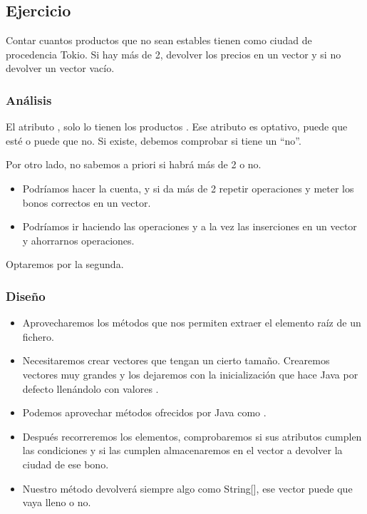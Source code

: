 \documentclass[letterpaper,10pt,spanish]{sphinxmanual}
\begin{document}
\subsection{Ejercicio}
\label{tema6:id13}
Contar cuantos productos que no sean estables tienen como ciudad de procedencia Tokio. Si hay más de 2, devolver los precios en un vector y si no devolver un vector vacío.


\subsubsection{Análisis}
\label{tema6:id14}
El atributo , solo lo tienen los productos . Ese atributo es optativo, puede que esté o puede que no. Si existe, debemos comprobar si tiene un ``no''.

Por otro lado, no sabemos a priori si habrá más de 2 o no.
\begin{itemize}
\item {} 
Podríamos hacer la cuenta, y si da más de 2 repetir operaciones y meter los bonos correctos en un vector.

\item {} 
Podríamos ir haciendo las operaciones y a la vez las inserciones en un vector y ahorrarnos operaciones.

\end{itemize}

Optaremos por la segunda.


\subsubsection{Diseño}
\label{tema6:id15}\begin{itemize}
\item {} 
Aprovecharemos los métodos que nos permiten extraer el elemento raíz de un fichero.

\item {} 
Necesitaremos crear vectores que tengan un cierto tamaño. Crearemos vectores muy grandes y los dejaremos con la inicialización que hace Java por defecto llenándolo con valores .

\item {} 
Podemos aprovechar métodos ofrecidos por Java como .

\item {} 
Después recorreremos los elementos, comprobaremos si sus atributos cumplen las condiciones y si las cumplen almacenaremos en el vector a devolver la ciudad de ese bono.

\item {} 
Nuestro método devolverá siempre algo como String{[}{]}, ese vector puede que vaya lleno o no.

\end{itemize}
\end{document}
